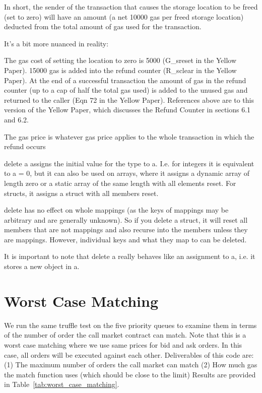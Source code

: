 In short, the sender of the transaction that causes the storage location to be freed (set to zero) will have an amount (a net 10000 gas per freed storage location) deducted from the total amount of gas used for the transaction.

It's a bit more nuanced in reality:

The gas cost of setting the location to zero is 5000 (G_sreset in the Yellow Paper).
15000 gas is added into the refund counter (R_sclear in the Yellow Paper).
At the end of a successful transaction the amount of gas in the refund counter (up to a cap of half the total gas used) is added to the unused gas and returned to the caller (Eqn 72 in the Yellow Paper).
References above are to this version of the Yellow Paper, which discusses the Refund Counter in sections 6.1 and 6.2.

The gas price is whatever gas price applies to the whole transaction in which the refund occurs




delete a assigns the initial value for the type to a. I.e. for integers it is equivalent to a = 0, but it can also be used on arrays, where it assigns a dynamic array of length zero or a static array of the same length with all elements reset. For structs, it assigns a struct with all members reset.

delete has no effect on whole mappings (as the keys of mappings may be arbitrary and are generally unknown). So if you delete a struct, it will reset all members that are not mappings and also recurse into the members unless they are mappings. However, individual keys and what they map to can be deleted.

It is important to note that delete a really behaves like an assignment to a, i.e. it stores a new object in a.

 \section{Worst Case Matching}
 We run the same truffle test on the five priority queues to examine them in terms of the number of order the call market contract can match.
 Note that this is a worst case matching where we use same prices for bid and ask orders. In this case, all orders will be executed against each other.
 Deliverables of this code are: (1) The maximum number of orders the call market can match (2) How much gas the match function uses (which should be close to the limit)
Results are provided in Table~\ref{tab:worst_case_matching}.


